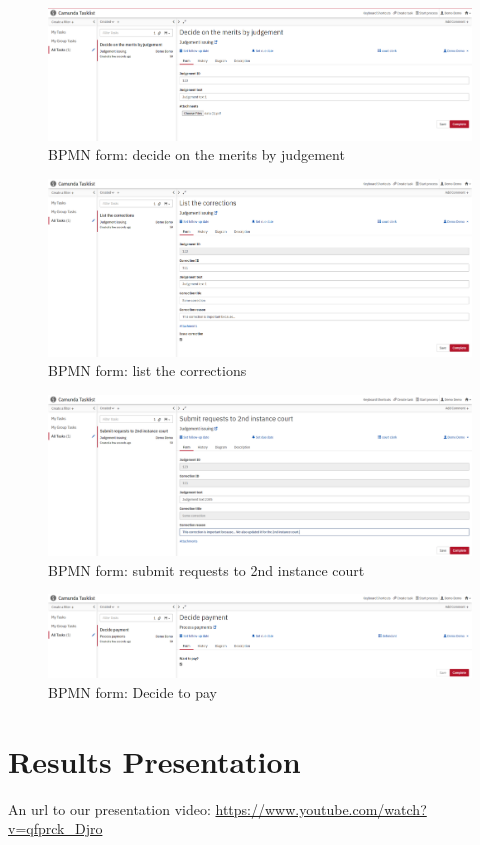     \begin{landscape}
        
        \begin{figure}[h]\centering
            \includegraphics[width=22cm]{pic/camunda1}
            \caption{BPMN form: decide on the merits by judgement}
            \label{fig:camunda1}
        \end{figure}
    
        \begin{figure}[h]\centering
            \includegraphics[width=22cm]{pic/camunda2}
            \caption{BPMN form: list the corrections}
            \label{fig:camunda2}
        \end{figure}
    
        \begin{figure}[h]\centering
            \includegraphics[width=22cm]{pic/camunda3}
            \caption{BPMN form: submit requests to 2nd instance court}
            \label{fig:camunda3}
        \end{figure}
    
        \begin{figure}[h]\centering
            \includegraphics[width=22cm]{pic/camunda4}
            \caption{BPMN form: Decide to pay}
            \label{fig:camunda4}
        \end{figure}
    
    \end{landscape}

\section{Results Presentation}\label{sec:presentation}

An url to our presentation video: \url{https://www.youtube.com/watch?v=qfprck_Djro}
